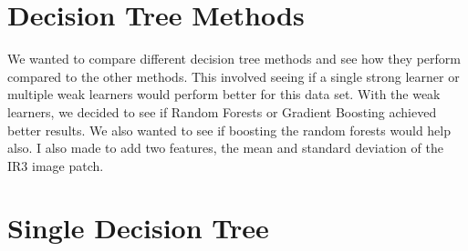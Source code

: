 \documentclass[twoside,11pt]{article}
\theoremstyle{definition}
\begin{document}
\section*{Decision Tree Methods}

We wanted to compare different decision tree methods and see how they perform compared to the other methods. This involved seeing if a single strong learner or multiple weak learners would perform better for this data set. With the weak learners, we decided to see if Random Forests or Gradient Boosting achieved better results. We also wanted to see if boosting the random forests would help also. I also made to add two features, the mean and standard deviation of the IR3 image patch.    

\section*{Single Decision Tree} 
\end{document}
